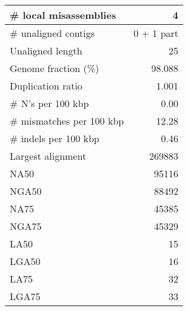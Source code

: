 \documentclass[12pt,a4paper]{article}
\begin{document}
\begin{table}[ht]
\begin{center}
\begin{tabular}{|l*{1}{|r}|}
\# local misassemblies & 4 \\ \hline
\# unaligned contigs & 0 + 1 part \\ \hline
Unaligned length & 25 \\ \hline
Genome fraction (\%) & 98.088 \\ \hline
Duplication ratio & 1.001 \\ \hline
\# N's per 100 kbp & 0.00 \\ \hline
\# mismatches per 100 kbp & 12.28 \\ \hline
\# indels per 100 kbp & 0.46 \\ \hline
Largest alignment & 269883 \\ \hline
NA50 & 95116 \\ \hline
NGA50 & 88492 \\ \hline
NA75 & 45385 \\ \hline
NGA75 & 45329 \\ \hline
LA50 & 15 \\ \hline
LGA50 & 16 \\ \hline
LA75 & 32 \\ \hline
LGA75 & 33 \\ \hline
\end{tabular}
\end{center}
\end{table}
\end{document}
